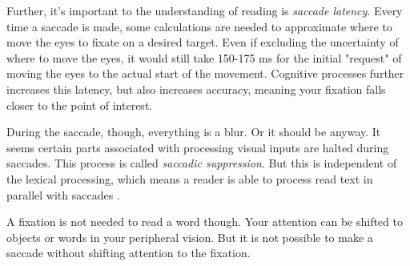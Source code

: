 Further, it's important to the understanding of reading is \textit{saccade latency}. Every time a saccade is made, some calculations are needed to approximate where to move the eyes to fixate on a desired target. Even if excluding the uncertainty of where to move the eyes, it would still take 150-175 ms for the initial "request" of moving the eyes to the actual start of the movement. Cognitive processes further increases this latency, but also increases accuracy, meaning your fixation falls closer to the point of interest.


During the saccade, though, everything is a blur. Or it should be anyway. It seems certain parts associated with processing visual inputs are halted during saccades. This process is called \textit{saccadic suppression}. But this is independent of the lexical processing, which means a reader is able to process read text in parallel with saccades \cite{eyeMovement}.

A fixation is not needed to read a word though. Your attention can be shifted to objects or words in your peripheral vision. But it is not possible to make a saccade without shifting attention to the fixation.